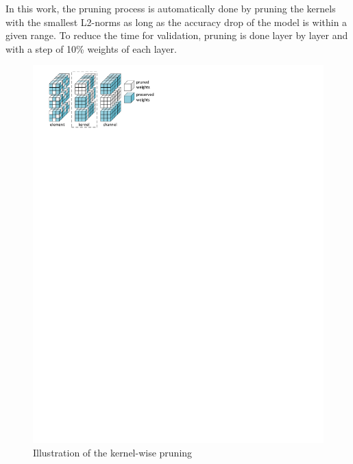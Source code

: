 In this work, the pruning process is automatically done by pruning the kernels with the smallest L2-norms as long as the accuracy drop of the model is within a given range. To reduce the time for validation, pruning is done layer by layer and with a step of 10\% weights of each layer.

\begin{figure}[tb]
    \centering
    \includegraphics[width=0.9\columnwidth]{figures/prune.pdf}
    \caption{Illustration of the kernel-wise pruning}\label{fig:prune}
\end{figure}

